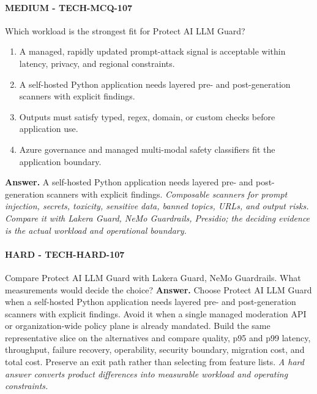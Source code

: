 \paragraph{MEDIUM - TECH-MCQ-107} Which workload is the strongest fit for Protect AI LLM Guard?
\begin{enumerate}[label=\Alph*.]
\item A managed, rapidly updated prompt-attack signal is acceptable within latency, privacy, and regional constraints.
\item A self-hosted Python application needs layered pre- and post-generation scanners with explicit findings.
\item Outputs must satisfy typed, regex, domain, or custom checks before application use.
\item Azure governance and managed multi-modal safety classifiers fit the application boundary.
\end{enumerate}
\textbf{Answer.} A self-hosted Python application needs layered pre- and post-generation scanners with explicit findings.
\textit{Composable scanners for prompt injection, secrets, toxicity, sensitive data, banned topics, URLs, and output risks. Compare it with Lakera Guard, NeMo Guardrails, Presidio; the deciding evidence is the actual workload and operational boundary.}
\paragraph{HARD - TECH-HARD-107} Compare Protect AI LLM Guard with Lakera Guard, NeMo Guardrails. What measurements would decide the choice?
\textbf{Answer.} Choose Protect AI LLM Guard when a self-hosted Python application needs layered pre- and post-generation scanners with explicit findings. Avoid it when a single managed moderation API or organization-wide policy plane is already mandated. Build the same representative slice on the alternatives and compare quality, p95 and p99 latency, throughput, failure recovery, operability, security boundary, migration cost, and total cost. Preserve an exit path rather than selecting from feature lists.
\textit{A hard answer converts product differences into measurable workload and operating constraints.}
